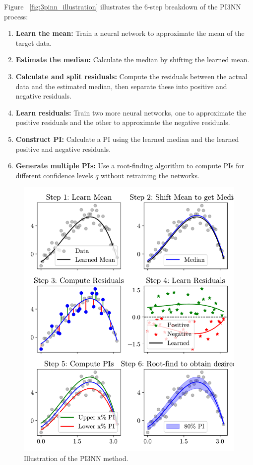 Figure ~\vref{fig:3pinn_illustration} illustrates the 6-step breakdown of the PI3NN process:
\begin{enumerate}
    \item \textbf{Learn the mean:} Train a neural network to approximate the mean of the target data.
    \item \textbf{Estimate the median:} Calculate the median by shifting the learned mean.
    \item \textbf{Calculate and split residuals:} Compute the residuals between the actual data and the estimated median, then separate these into positive and negative residuals.
    \item \textbf{Learn residuals:} Train two more neural networks, one to approximate the positive residuals and the other to approximate the negative residuals.
    \item \textbf{Construct PI:} Calculate a PI using the learned median and the learned positive and negative residuals.
    \item \textbf{Generate multiple PIs:} Use a root-finding algorithm to compute PIs for different confidence levels $q$ without retraining the networks.
\end{enumerate}


\begin{figure}[h]
    \centering
    \includegraphics{figs/3pinn_illustration.pdf}
    \caption{Illustration of the PI3NN method.}
    \label{fig:3pinn_illustration}
\end{figure}





